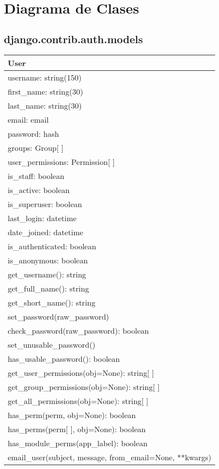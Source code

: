 \chapter{Diagrama de Clases}

\section{django.contrib.auth.models}

\begin{tabular}{|l|}
	\hline
	\textbf{User} \\
	\hline
	username: string(150) \\
	first\_name: string(30) \\
	last\_name: string(30) \\
	email: email \\
	password: hash \\
	groups: Group[ ] \\
	user\_permissions: Permission[ ] \\
	is\_staff: boolean \\
	is\_active: boolean \\
	is\_superuser: boolean \\
	last\_login: datetime \\
	date\_joined: datetime \\
	\hline
	is\_authenticated: boolean \\
	is\_anonymous: boolean \\
	\hline
	get\_username(): string \\
	get\_full\_name(): string \\
	get\_short\_name(): string \\
	set\_password(raw\_password) \\
	check\_password(raw\_password): boolean \\
	set\_unusable\_password() \\
	has\_usable\_password(): boolean \\
	get\_user\_permissions(obj=None): string[ ] \\
	get\_group\_permissions(obj=None): string[ ] \\
	get\_all\_permissions(obj=None): string[ ] \\
	has\_perm(perm, obj=None): boolean \\
	has\_perms(perm[ ], obj=None): boolean \\
	has\_module\_perms(app\_label): boolean \\
	email\_user(subject, message, from\_email=None, **kwargs) \\
	\hline
\end{tabular}\\

